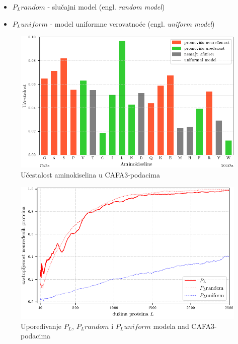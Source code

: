 \documentclass{beamer}
\newcommand{\en}[1]{(engl. \textit{#1})}
\begin{document}
\begin{frame}{}
  \begin{itemize}
    \item $P_L random$ - slučajni model \en{random model} 
    \item $P_L uniform$  - model uniformne verovatnoće  \en{uniform model}
  \end{itemize}

  \begin{figure}[th]
    \centering
    \includegraphics[scale=0.7]{plots/AK_ucestalost}
    \vspace{-0.2cm}
    \caption{ \footnotesize Učestalost aminokiselina u CAFA3-podacima }
  \end{figure}
\end{frame}

\begin{frame}
  \begin{figure}[th]
    \centering
    \includegraphics[scale=0.8]{plots/PL_F_cmp}
    \caption{Upoređivanje $P_L$, $P_L random$ i $P_L uniform$ modela nad
    CAFA3-podacima}
  \end{figure}
\end{frame}
\end{document}

